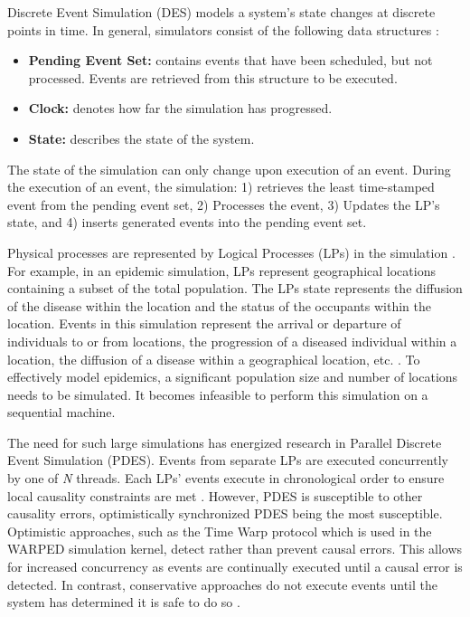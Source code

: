 \documentclass[a4paper]{article}
\let\origitem\item
\renewcommand{\item}{\normalfont\origitem}
\begin{document}
Discrete Event Simulation (DES) models a system's state changes at discrete
points in time.  In general, simulators consist of the following data structures
\cite{fujimoto}:\par
\begin{itemize}
\item\textbf{Pending Event Set:} contains events that have been scheduled, but not
processed.  Events are retrieved from this structure to be executed.
\item\textbf{Clock:} denotes how far the simulation has progressed.
\item\textbf{State:} describes the state of the system.
\end{itemize}
The state of the simulation can only change upon execution of an event.
During the execution of an event, the simulation: 1) retrieves the least 
time-stamped event from the pending event set, 2) Processes the event, 3) Updates
the LP's state, and 4) inserts generated events into the pending event set.
\par

\indent
Physical processes are represented by Logical Processes (LPs) in the simulation
\cite{des_misra}.  For example, in an epidemic simulation, LPs represent
geographical locations containing a subset of the total population.  The LPs
state represents the diffusion of the disease within the location and the status
of the occupants within the location.  Events in this simulation represent the
arrival or departure of individuals to or from locations, the progression of a
diseased individual within a location, the diffusion of a disease within a
geographical location, etc. \cite{epidemic}. To effectively model epidemics, a
significant population size and number of locations needs to be simulated.  It
becomes infeasible to perform this simulation on a sequential machine.  
\par

The need for such large simulations has energized research in Parallel Discrete
Event Simulation (PDES).  Events from separate LPs are executed concurrently by
one of \textit{N} threads.  Each LPs' events execute in chronological
order to ensure local causality constraints are met \cite{fujimoto}.  However,
PDES is susceptible to other causality errors, optimistically synchronized PDES
being the most susceptible.  Optimistic approaches, such as the Time Warp
protocol which is used in the WARPED simulation kernel, detect rather than
prevent causal errors.  This allows for increased concurrency as events are
continually executed until a causal error is detected.  In contrast,
conservative approaches do not execute events until the system has determined it
is safe to do so \cite{fujimoto}.
\par
\end{document}
